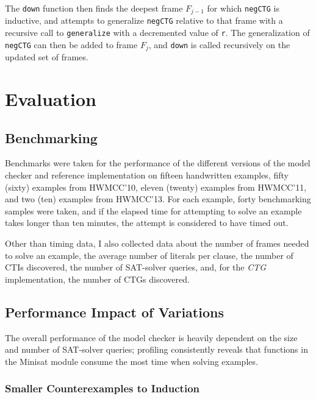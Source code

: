 \documentclass[12pt,a4paper,twoside,openright]{report}
\begin{document}
The \verb,down, function then finds the deepest frame $F_{j - 1}$ for which \verb,negCTG, is inductive, and attempts to generalize
\verb,negCTG, relative to that frame with a recursive call to \verb,generalize, with a decremented value of \verb,r,.
The generalization of \verb,negCTG, can then be added to frame $F_j$,
and \verb,down, is called recursively on the updated set of frames.

\chapter{Evaluation}

\section{Benchmarking}
Benchmarks were taken for the performance of the different versions of the model checker and reference implementation
on fifteen handwritten examples, fifty (sixty) examples from HWMCC'10, eleven (twenty) examples from HWMCC'11, and
two (ten) examples from HWMCC'13. For each example, forty benchmarking samples were taken, and if the elapsed time for
attempting to solve an example takes longer than ten minutes, the attempt is considered to have timed out.

Other than timing data, I also collected data about the number of frames needed to solve an example,
the average number of literals per clause, the number of CTIs discovered, the number of SAT-solver queries, and,
for the \emph{CTG} implementation, the number of CTGs discovered.

\section{Performance Impact of Variations}

The overall performance of the model checker is heavily dependent on the size and number of SAT-solver queries;
profiling consistently reveals that functions in the Minisat module consume the most time when solving examples.

\subsection{Smaller Counterexamples to Induction}
\end{document}

